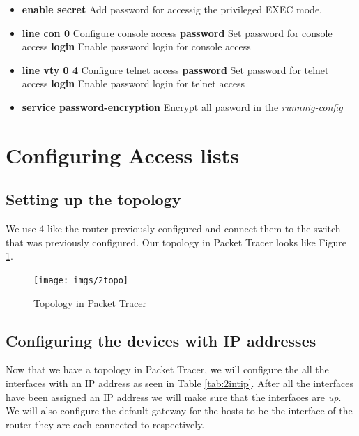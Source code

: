 \documentclass{article}
\begin{document}
\begin{itemize}
    \item \textbf{enable secret} Add password for accessig the privileged EXEC mode.
    \item \textbf{line con 0} Configure console access 
        \subitem \textbf{password} Set password for console access
        \subitem \textbf{login} Enable password login for console access
    \item \textbf{line vty 0 4} Configure telnet access
        \subitem \textbf{password} Set password for telnet access
        \subitem \textbf{login} Enable password login for telnet access
     \item \textbf{service password-encryption} Encrypt all pasword in the \textit{runnnig-config}
\end{itemize}

\section{Configuring Access lists}


\subsection{Setting up the topology}

We use 4 like the router previously configured and connect them to the switch that was previously configured. Our topology in Packet Tracer looks like Figure \ref{fig:2topo}.

\begin{figure}[h]
\centering
\texttt{[image: imgs/2topo]}
\caption{Topology in Packet Tracer}
\label{fig:2topo}
\end{figure}

\subsection{Configuring the devices with IP addresses}

Now that we have a topology in Packet Tracer, we will configure the all the interfaces with an IP address as seen in Table \ref{tab:2intip}. After all the interfaces have been assigned an IP address we will make sure that the interfaces are \textit{up}. We will also configure the default gateway for the hosts to be the interface of the router they are each connected to respectively.
\end{document}
